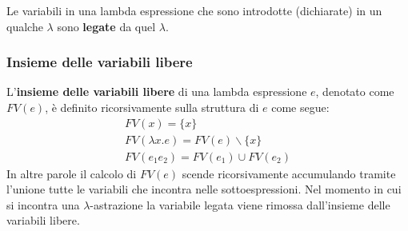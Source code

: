 Le variabili in una lambda espressione che sono introdotte (dichiarate) in un qualche $\lambda$ sono
\textbf{legate} da quel $\lambda$.

\subsubsection{Insieme delle variabili libere}
L'\textbf{insieme delle variabili libere} di una lambda espressione $e$, denotato come $FV(e)$, è definito
ricorsivamente sulla struttura di $e$ come segue:
\begin{gather*}
	FV(x) = \{ x \} \\
	FV(\lambda x.e) = FV(e) \backslash \{ x \} \\
	FV(e_1 e_2) = FV(e_1) \cup FV(e_2)
\end{gather*}
In altre parole il calcolo di $FV(e)$ scende ricorsivamente accumulando tramite l'unione tutte le variabili che
incontra nelle sottoespressioni. Nel momento in cui si incontra una $\lambda$-astrazione la variabile legata
viene rimossa dall'insieme delle variabili libere.